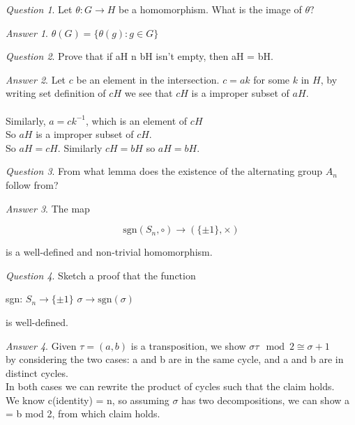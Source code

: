 \documentclass[]{article}
\theoremstyle{remark}
\theoremstyle{qnstyle}
\newtheorem{question}{Question}
\theoremstyle{answerstyle}
\newtheorem*{answer}{Answer}
\begin{document}
{
    \begin{question}
        Let $\theta: G \to H$ be a homomorphism. What is the image of $\theta?$
    \end{question}
    \begin{answer}
        $\theta(G) = \{\theta(g) : g \in G\}$
    \end{answer}
}
{
    \begin{question}
        Prove that if aH n bH isn't empty, then aH = bH.
    \end{question}
    \begin{answer}
        Let $c$ be an element in the intersection.
        $c = ak$ for some $k$ in $H$, by writing set definition of $cH$ we see that $cH$ is a improper subset of $aH$.\\ \\
        Similarly, $a = ck^{-1}$, which is an element of $cH$ \\
        So $aH$ is a improper subset of $cH$. \\
        So $aH = cH$. Similarly $cH = bH$ so $aH = bH$.
    \end{answer}
}
{
    \begin{question}
        From what lemma does the existence of the alternating group $A_n$ follow from?
    \end{question}
    \begin{answer}
        The map

        $$\text{sgn}(S_n, \circ) \to (\{ \pm 1\}, \times)$$

        is a well-defined and non-trivial homomorphism.
    \end{answer}
}
{
    \begin{question}
        Sketch a proof that the function

        sgn: $S_n \to \{\pm 1\}$
        $\sigma \to \text{sgn}(\sigma)$

        is well-defined.
    \end{question}
    \begin{answer}
        Given $\tau = (a,b)$ is a transposition, we show $\sigma \tau \mod 2 \cong \sigma + 1$  \\
        by considering the two cases: a and b are in the same cycle, and a and b are in distinct cycles.  \\
        In both cases we can rewrite the product of cycles such that the claim holds. \\
        We know c(identity) = n, so assuming $\sigma$ has two decompositions, we can show a = b mod 2, from which claim holds.
    \end{answer}
}
\end{document}
